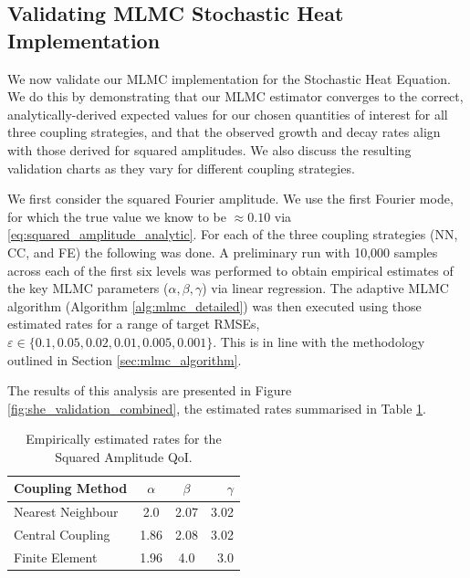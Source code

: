 \subsection{Validating MLMC Stochastic Heat Implementation}\label{sec:stoch_heat_validation}

We now validate our MLMC implementation for the Stochastic Heat Equation.
We do this by demonstrating that our MLMC estimator converges to the correct, 
analytically-derived expected values for our chosen quantities of interest for
all three coupling strategies, and that the observed 
growth and decay rates align with those derived for squared amplitudes. 
We also discuss the resulting validation charts as they vary for different coupling 
strategies.

We first consider the squared Fourier amplitude. We use the first Fourier mode, 
for which the true value we know to 
be $\approx 0.10$
via \eqref{eq:squared_amplitude_analytic}.
For each of the three coupling strategies (NN, CC, and FE) the following was done. 
A preliminary run with 10,000 samples across each of 
the first six levels was performed to obtain 
empirical estimates of the key MLMC 
parameters ($\alpha, \beta, \gamma$) via linear regression. 
The adaptive MLMC algorithm (Algorithm \ref{alg:mlmc_detailed}) was then 
executed using those estimated rates for a range of 
target RMSEs, $\varepsilon \in \{0.1, 0.05, 0.02, 0.01, 0.005, 0.001\}$. 
This is in line with the methodology outlined in Section
\ref{sec:mlmc_algorithm}.

The results of this analysis are presented in Figure \ref{fig:she_validation_combined}, 
the estimated rates summarised in Table \ref{tab:she_decay_rates}.

\begin{table}[htbp]
    \centering
    \begin{tabular}{|l|c|c|r|}
        \hline
        \textbf{Coupling Method} & \textbf{$\alpha$} & \textbf{$\beta$} & \textbf{$\gamma$} \\
        \hline
        Nearest Neighbour & 2.0 & 2.07 & 3.02\\
        Central Coupling & 1.86 & 2.08 & 3.02 \\
        Finite Element & 1.96 & 4.0 & 3.0 \\
        \hline
    \end{tabular}
    \caption{Empirically estimated rates for the Squared Amplitude QoI.}
    \label{tab:she_decay_rates}
\end{table}

